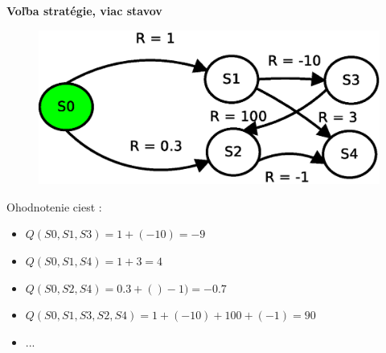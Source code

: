 \documentclass[xcolor=dvipsnames]{beamer}
\begin{document}
\begin{frame}{\bf Voľba stratégie, viac stavov}

  \begin{figure}[!htb]
  \centering
  \includegraphics[scale=.6]{../diagrams/rf_more_states.eps}
  \end{figure}

  Ohodnotenie ciest :
  \begin{itemize}
    \item $Q(S0, S1, S3) = 1+(-10) = -9$
    \item $Q(S0, S1, S4) = 1+3 = 4$
    \item $Q(S0, S2, S4) = 0.3 +()-1) =-0.7$
    \item $Q(S0, S1, S3, S2, S4) = 1 +(-10) +100 + (-1) = 90$
    \item ...
  \end{itemize}

\end{frame}
\end{document}
